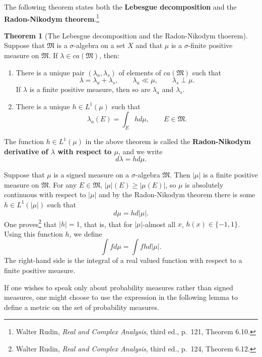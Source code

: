 \documentclass{article}
\theoremstyle{definition}
\newtheorem{theorem}{Theorem}
\theoremstyle{definition}
\begin{document}
The following theorem states both the \textbf{Lebesgue decomposition} and the \textbf{Radon-Nikodym theorem}.\footnote{Walter Rudin, {\em Real and Complex Analysis}, third ed.,
p.~121, Theorem 6.10.} 


\begin{theorem}[The Lebesgue decomposition and the Radon-Nikodym thoerem]
Suppose that $\mathfrak{M}$ is a $\sigma$-algebra on a set $X$ and that $\mu$ is a $\sigma$-finite  positive measure on $\mathfrak{M}$.
If $\lambda \in ca(\mathfrak{M})$, then:
\begin{enumerate}
\item There is a unique pair $(\lambda_a,\lambda_s)$ of elements of $ca(\mathfrak{M})$ such that
\[
\lambda=\lambda_a+\lambda_s, \qquad \lambda_a \ll \mu, \qquad \lambda_s \perp \mu.
\]
If $\lambda$ is a finite positive measure, then so are $\lambda_a$ and $\lambda_s$.
\item There is a unique $h \in L^1(\mu)$ such that
\[
\lambda_a(E) = \int_E h d\mu, \qquad E \in \mathfrak{M}.
\]
\end{enumerate}
\end{theorem}

The function $h \in L^1(\mu)$  in the above theorem is called the \textbf{Radon-Nikodym derivative of $\lambda$ with respect to $\mu$}, and we write
\[
d\lambda = h d\mu.
\]

Suppose that $\mu$ is a signed measure on a $\sigma$-algebra $\mathfrak{M}$. Then $|\mu|$ is a finite positive measure on $\mathfrak{M}$. For any $E \in
\mathfrak{M}$, $|\mu|(E) \geq |\mu(E)|$, so $\mu$ is absolutely continuous with respect to $|\mu|$ and by the Radon-Nikodym theorem there is some
$h \in L^1(|\mu|)$ such that
\[
d\mu = h d|\mu|.
\]
One proves\footnote{Walter Rudin, {\em Real and Complex Analysis}, third ed., p.~124, Theorem 6.12.} that $|h|=1$, that is, that for $|\mu|$-almost all $x$, $h(x) \in \{-1,1\}$.
Using this function $h$, we define
\[
\int f d\mu = \int fh d|\mu|.
\]
The right-hand side is the integral of a real valued function with respect to a finite positive measure.


If one wishes to speak only about probability measures rather than signed measures, one might choose to use the expression in the following lemma to define a metric on the set of probability measures.
\end{document}
